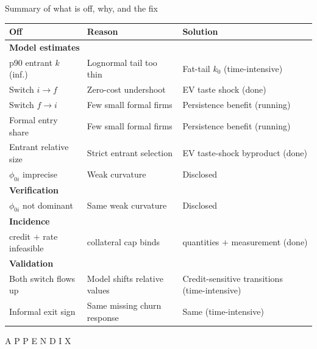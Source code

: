 \documentclass[11pt,aspectratio=169]{beamer}
\providecommand{\infml}{i}
\providecommand{\fml}{f}
\providecommand{\spreadfix}[1]{\phi_{0#1}}
\begin{document}
\begin{frame}{Summary of what is off, why, and the fix}
\begin{center}
\renewcommand{\arraystretch}{1.3}\scriptsize
\begin{tabular}{lll}
\toprule
Off & Reason & Solution \\
\midrule
\multicolumn{3}{l}{\textbf{Model estimates}} \\
p90 entrant $k$ (inf.) & Lognormal tail too thin & Fat-tail $k_0$ (time-intensive) \\
Switch $\infml\to\fml$ & Zero-cost undershoot & EV taste shock (done) \\
Switch $\fml\to\infml$ & Few small formal firms & Persistence benefit (running) \\
Formal entry share & Few small formal firms & Persistence benefit (running) \\
Entrant relative size & Strict entrant selection & EV taste-shock byproduct (done) \\
$\spreadfix{\infml}$ imprecise & Weak curvature & Disclosed \\
\midrule
\multicolumn{3}{l}{\textbf{Verification}} \\
$\spreadfix{\infml}$ not dominant & Same weak curvature & Disclosed \\
\midrule
\multicolumn{3}{l}{\textbf{Incidence}} \\
credit $+$ rate infeasible & collateral cap binds & quantities $+$ measurement (done) \\
\midrule
\multicolumn{3}{l}{\textbf{Validation}} \\
Both switch flows up & Model shifts relative values & Credit-sensitive transitions (time-intensive) \\
Informal exit sign & Same missing churn response & Same (time-intensive) \\
\bottomrule
\end{tabular}
\end{center}

\end{frame}


\begin{frame}[noframenumbering]{}

\center
\Huge
A P P E N D I X

\end{frame}

\end{document}
